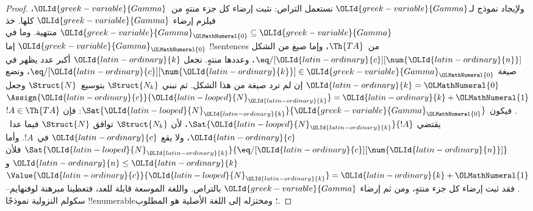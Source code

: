 \documentclass[../../../include/open-logic-section]{subfiles}
\begin{document}
\begin{proof}
ولإيجاد نموذج لـ${\OLId{greek-variable}{Gamma}}$ نستعمل التراص: نثبت إرضاء كل جزء
منتهٍ من~${\OLId{greek-variable}{Gamma}}$، فيلزم إرضاء ${\OLId{greek-variable}{Gamma}}$ كلها. خذ
${\OLId{greek-variable}{Gamma}}_{\OLMathNumeral{0}} \subseteq {\OLId{greek-variable}{Gamma}}$ منتهية. وما في ${\OLId{greek-variable}{Gamma}}_{\OLMathNumeral{0}}$
إما !!{sentence}s من~$\Th{TA}$، وإما صيغ من الشكل
$\eq/[{\OLId{latin-ordinary}{c}}][\num{{\OLId{latin-ordinary}{n}}}]$، وعددها منتهٍ. نجعل ${\OLId{latin-ordinary}{k}}$ أكبر عدد
يظهر في صيغة $\eq/[{\OLId{latin-ordinary}{c}}][\num{{\OLId{latin-ordinary}{k}}}] \in {\OLId{greek-variable}{Gamma}}_{\OLMathNumeral{0}}$، ونضع ${\OLId{latin-ordinary}{k}}={\OLMathNumeral{0}}$
إن لم ترد صيغة من هذا الشكل. ثم نبني $\Struct{N_k}$
بتوسيع~$\Struct{N}$ وجعل $\Assign{{\OLId{latin-ordinary}{c}}}{{\OLId{latin-looped}{N}}_{\OLId{latin-ordinary}{k}}}={\OLId{latin-ordinary}{k}}+{\OLMathNumeral{1}}$.
فيكون $\Sat{{\OLId{latin-looped}{N}}_{\OLId{latin-ordinary}{k}}}{{\OLId{greek-variable}{Gamma}}_{\OLMathNumeral{0}}}$: فإن $!A \in \Th{TA}$
يقتضي $\Sat{{\OLId{latin-looped}{N}}_{\OLId{latin-ordinary}{k}}}{!A}$، لأن $\Struct{N_k}$ توافق
$\Struct{N}$ فيما عدا~${\OLId{latin-ordinary}{c}}$، ولا يقع ${\OLId{latin-ordinary}{c}}$ في~$!A$.
وأما $\Sat{{\OLId{latin-looped}{N}}_{\OLId{latin-ordinary}{k}}}{\eq/[{\OLId{latin-ordinary}{c}}][\num{{\OLId{latin-ordinary}{n}}}]}$ فلأن ${\OLId{latin-ordinary}{n}} \le {\OLId{latin-ordinary}{k}}$
و$\Value{{\OLId{latin-ordinary}{c}}}{{\OLId{latin-looped}{N}}_{\OLId{latin-ordinary}{k}}}={\OLId{latin-ordinary}{k}}+{\OLMathNumeral{1}}$. فقد ثبت إرضاء كل جزء منتهٍ،
ومن ثم إرضاء ${\OLId{greek-variable}{Gamma}}$ بالتراص. واللغة الموسعة قابلة للعد،
فتعطينا مبرهنة لوفنهايم--سكولم النزولية نموذجًا !!{enumerable}؛
ومختزله إلى اللغة الأصلية هو المطلوب.
\end{proof}
\end{document}
